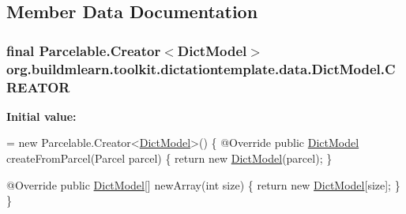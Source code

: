\subsection{Member Data Documentation}
\subsubsection[{\texorpdfstring{C\+R\+E\+A\+T\+OR}{CREATOR}}]{\setlength{\rightskip}{0pt plus 5cm}final Parcelable.\+Creator$<${\bf Dict\+Model}$>$ org.\+buildmlearn.\+toolkit.\+dictationtemplate.\+data.\+Dict\+Model.\+C\+R\+E\+A\+T\+OR\hspace{0.3cm}{\ttfamily [static]}}\hypertarget{classorg_1_1buildmlearn_1_1toolkit_1_1dictationtemplate_1_1data_1_1DictModel_a93129740b23b9a459d90aecdb118b8dd}{}\label{classorg_1_1buildmlearn_1_1toolkit_1_1dictationtemplate_1_1data_1_1DictModel_a93129740b23b9a459d90aecdb118b8dd}
{\bfseries Initial value\+:}
\begin{DoxyCode}
= \textcolor{keyword}{new} Parcelable.Creator<\hyperlink{classorg_1_1buildmlearn_1_1toolkit_1_1dictationtemplate_1_1data_1_1DictModel_a5a08c320a4378d22fb4d19d6cbfc4bac}{DictModel}>() \{
        @Override
        \textcolor{keyword}{public} \hyperlink{classorg_1_1buildmlearn_1_1toolkit_1_1dictationtemplate_1_1data_1_1DictModel_a5a08c320a4378d22fb4d19d6cbfc4bac}{DictModel} createFromParcel(Parcel parcel) \{
            \textcolor{keywordflow}{return} \textcolor{keyword}{new} \hyperlink{classorg_1_1buildmlearn_1_1toolkit_1_1dictationtemplate_1_1data_1_1DictModel_a5a08c320a4378d22fb4d19d6cbfc4bac}{DictModel}(parcel);
        \}

        @Override
        \textcolor{keyword}{public} \hyperlink{classorg_1_1buildmlearn_1_1toolkit_1_1dictationtemplate_1_1data_1_1DictModel_a5a08c320a4378d22fb4d19d6cbfc4bac}{DictModel}[] newArray(\textcolor{keywordtype}{int} size) \{
            \textcolor{keywordflow}{return} \textcolor{keyword}{new} \hyperlink{classorg_1_1buildmlearn_1_1toolkit_1_1dictationtemplate_1_1data_1_1DictModel_a5a08c320a4378d22fb4d19d6cbfc4bac}{DictModel}[size];
        \}
    \}
\end{DoxyCode}
